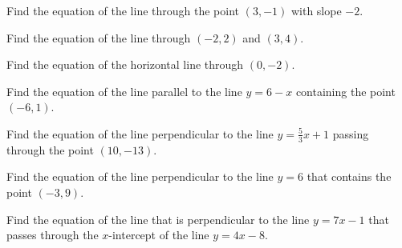 \documentclass[11pt,letterpaper]{article}
\begin{document}


 Find the equation of the line through the point $(3, -1)$ with slope $-2$.





\newpage





 Find the equation of the line through $(-2, 2)$ and $(3, 4)$.





\newpage





 Find the equation of the horizontal line through $(0, -2)$. 





\newpage





 Find the equation of the line parallel to the line $y= 6 - x$ containing the point $(-6, 1)$. 





\newpage





 Find the equation of the line perpendicular to the line $y= \frac{5}{3} x + 1$ passing through the point $(10, -13)$. 





\newpage





 Find the equation of the line perpendicular to the line $y= 6$ that contains the point $(-3, 9)$. 





\newpage





 Find the equation of the line that is perpendicular to the line $y= 7x - 1$ that passes through the $x$-intercept of the line $y= 4x - 8$. 





\end{document}
